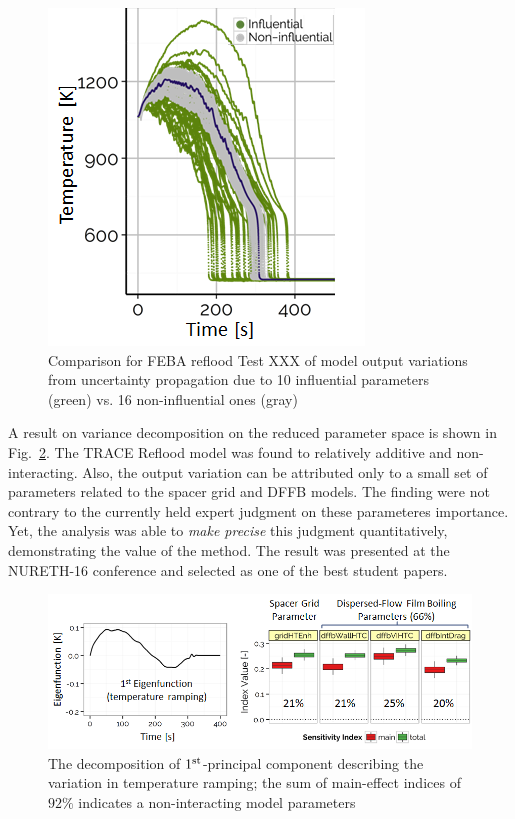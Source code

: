 \documentclass[11pt,titlepage]{article}
\begin{document}
\begin{figure}[h!]
	\centering
	\includegraphics[scale=0.62]{figures/influentialRuns.png}
	\caption{Comparison for FEBA reflood Test XXX of model output variations from uncertainty propagation due to 10 influential parameters (green) vs. 16 non-influential ones (gray)}
	\label{fig:influential}
\end{figure}

A result on variance decomposition on the reduced parameter space is shown in Fig.~\ref{fig:1stpc}.
The TRACE Reflood model was found to relatively additive and non-interacting.
Also, the output variation can be attributed only to a small set of parameters related to the spacer grid and DFFB models. 
The finding were not contrary to the currently held expert judgment on these parameteres importance.
Yet, the analysis was able to \emph{make precise} this judgment quantitatively, demonstrating the value of the method.
The result was presented at the NURETH-16 conference \cite{Wicaksono2015a} and selected as one of the best student papers.

\begin{figure}[h!]
	\centering
	\includegraphics[scale=0.65]{figures/1stPrincipalComponent.png}
	\caption{The decomposition of $1^\textnormal{st}$-principal component describing the variation in temperature ramping; the sum of main-effect indices of $92\%$ indicates a non-interacting model parameters}
	\label{fig:1stpc}
\end{figure}
\end{document}
